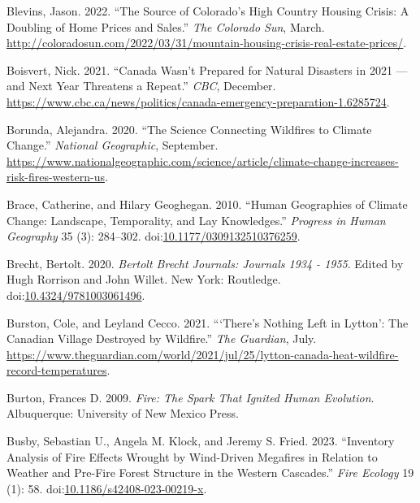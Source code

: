 \documentclass[
]{article}
\newlength{\cslhangindent}
\newenvironment{CSLReferences}[2] %
 {\begin{list}{}{%
  \setlength{\itemindent}{0pt}
  \setlength{\leftmargin}{0pt}
  \setlength{\parsep}{0pt}
  \ifodd #1
   \setlength{\leftmargin}{\cslhangindent}
   \setlength{\itemindent}{-1\cslhangindent}
  \fi
  \setlength{\itemsep}{#2\baselineskip}}}
 {\end{list}}
\begin{document}
\begin{CSLReferences}{1}{0}
Blevins, Jason. 2022. {``The Source of {Colorado}'s High Country Housing Crisis: A Doubling of Home Prices and Sales.''} \emph{The Colorado Sun}, March. \url{http://coloradosun.com/2022/03/31/mountain-housing-crisis-real-estate-prices/}.

Boisvert, Nick. 2021. {``Canada Wasn't Prepared for Natural Disasters in 2021 --- and Next Year Threatens a Repeat.''} \emph{CBC}, December. \url{https://www.cbc.ca/news/politics/canada-emergency-preparation-1.6285724}.

Borunda, Alejandra. 2020. {``The Science Connecting Wildfires to Climate Change.''} \emph{National Geographic}, September. \url{https://www.nationalgeographic.com/science/article/climate-change-increases-risk-fires-western-us}.

Brace, Catherine, and Hilary Geoghegan. 2010. {``Human Geographies of Climate Change: {Landscape}, Temporality, and Lay Knowledges.''} \emph{Progress in Human Geography} 35 (3): 284--302. doi:\href{https://doi.org/10.1177/0309132510376259}{10.1177/0309132510376259}.

Brecht, Bertolt. 2020. \emph{Bertolt {Brecht Journals}: {Journals} 1934 - 1955}. Edited by Hugh Rorrison and John Willet. New York: Routledge. doi:\href{https://doi.org/10.4324/9781003061496}{10.4324/9781003061496}.

Burston, Cole, and Leyland Cecco. 2021. {``{`{There}'s Nothing Left in {Lytton}'}: The {Canadian} Village Destroyed by Wildfire.''} \emph{The Guardian}, July. \url{https://www.theguardian.com/world/2021/jul/25/lytton-canada-heat-wildfire-record-temperatures}.

Burton, Frances D. 2009. \emph{Fire: The Spark That Ignited Human Evolution}. Albuquerque: University of New Mexico Press.

Busby, Sebastian U., Angela M. Klock, and Jeremy S. Fried. 2023. {``Inventory Analysis of Fire Effects Wrought by Wind-Driven Megafires in Relation to Weather and Pre-Fire Forest Structure in the Western {Cascades}.''} \emph{Fire Ecology} 19 (1): 58. doi:\href{https://doi.org/10.1186/s42408-023-00219-x}{10.1186/s42408-023-00219-x}.


\end{CSLReferences}
\end{document}
